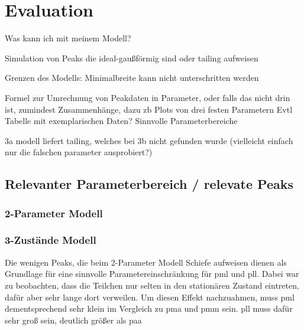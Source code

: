 
\chapter{Evaluation}
\label{chapter:eva}

Was kann ich mit meinem Modell?

Simulation von Peaks die ideal-gaußförmig sind oder tailing aufweisen

Grenzen des Modells:
Minimalbreite kann nicht unterschritten werden


Formel zur Umrechnung von Peakdaten in Parameter, oder falls das nicht drin ist, zumindest Zusammenhänge, dazu zb Plots von drei festen Parametern
Evtl Tabelle mit exemplarischen Daten?
Sinnvolle Parameterbereiche

3a modell liefert tailing, welches bei 3b nicht gefunden wurde (vielleicht einfach nur die falschen parameter ausprobiert?)

\section{Relevanter Parameterbereich / relevate Peaks}


\subsection{2-Parameter Modell}


\subsection{3-Zustände Modell}


Die wenigen Peaks, die beim 2-Parameter Modell Schiefe aufweisen dienen als Grundlage für eine sinnvolle Parametereinschränkung für pml und pll. Dabei war zu beobachten, dass die Teilchen nur selten in den stationären Zustand eintreten, dafür aber sehr lange dort verweilen. Um diesen Effekt nachzuahmen, muss pml dementsprechend sehr klein im Vergleich zu pma und pmm sein. pll muss dafür sehr groß sein, deutlich größer als paa

